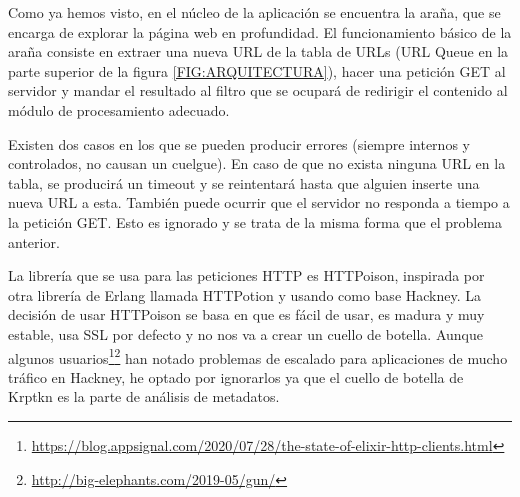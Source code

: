 Como ya hemos visto, en el núcleo de la aplicación se encuentra la araña, que se encarga de explorar la página web en profundidad. El funcionamiento básico de la araña consiste en extraer una nueva URL de la tabla de URLs (URL Queue en la parte superior de la figura \ref{FIG:ARQUITECTURA}), hacer una petición GET al servidor y mandar el resultado al filtro que se ocupará de redirigir el contenido al módulo de procesamiento adecuado.

Existen dos casos en los que se pueden producir errores (siempre internos y controlados, no causan un cuelgue). En caso de que no exista ninguna URL en la tabla, se producirá un timeout y se reintentará hasta que alguien inserte una nueva URL a esta. También puede ocurrir que el servidor no responda a tiempo a la petición GET. Esto es ignorado y se trata de la misma forma que el problema anterior.

La librería que se usa para las peticiones HTTP es HTTPoison, inspirada por otra librería de Erlang llamada HTTPotion y usando como base Hackney. La decisión de usar HTTPoison se basa en que es fácil de usar, es madura y muy estable, usa SSL por defecto y no nos va a crear un cuello de botella. Aunque algunos usuarios\footnote{\url{https://blog.appsignal.com/2020/07/28/the-state-of-elixir-http-clients.html}}\footnote{\url{http://big-elephants.com/2019-05/gun/}} han notado problemas de escalado para aplicaciones de mucho tráfico en Hackney, he optado por ignorarlos ya que el cuello de botella de Krptkn es la parte de análisis de metadatos.